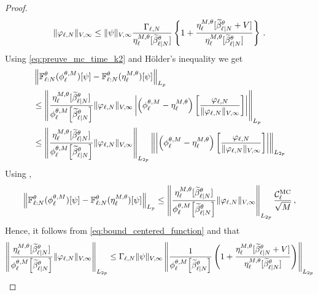 \documentclass[11pt]{article}
\theoremstyle{plain}
\theoremstyle{definition}
\theoremstyle{remark}
\begin{document}
\begin{proof}
\begin{equation}
\|\varphi_{\ell,N}\|_{V,\infty} \le \|\psi\|_{V,\infty} \frac{ \Gamma_{\ell,N} }{ \eta_\ell^{M,\theta} [ \normbackwardfun{\ell}{N}[\theta] ] } \left\{
1+ \frac{ \eta_\ell^{M,\theta} [ \normbackwardfun{\ell}{N}[\theta]+V ] }{ \eta_\ell^{M,\theta} [ \normbackwardfun{\ell}{N}[\theta] ] } 
\right\} \eqsp.
\end{equation}
Using \eqref{eq:preuve_mc_time_k2} and Hölder's inequality we get
\begin{align*}
& \normEc{ \filtertransform{\ell:N}[\theta](\mcfilter{\ell})[\psi] - \filtertransform{\ell:N}[\theta](\eta_\ell^{M,\theta})[\psi] }_{L_p} \\
& \le \normEc{ \frac{ \eta_\ell^{M,\theta} [ \normbackwardfun{\ell}{N}[\theta] ]
}{ \mcfilter{\ell}[ \normbackwardfun{\ell}{N}[\theta] ] } \|\varphi_{\ell,N}\|_{V,\infty} \left| \left(\mcfilter{\ell}-\eta_\ell^{M,\theta}\right) \left[ \frac{\varphi_{\ell,N}}{\|\varphi_{\ell,N}\|_{V,\infty}} \right]\right| }_{L_p} \\
& \le \normEc{ \frac{ \eta_\ell^{M,\theta} [ \normbackwardfun{\ell}{N}[\theta] ] }{ \mcfilter{\ell} [ \normbackwardfun{\ell}{N}[\theta] ] } \|\varphi_{\ell,N}\|_{V,\infty} }_{L_{2p}} \normEc{ \left| \left(\mcfilter{\ell}-\eta_\ell^{M,\theta}\right) \left[ \frac{\varphi_{\ell,N}}{\|\varphi_{\ell,N}\|_{V,\infty}} \right] \right| }_{L_{2p}} \\
\end{align*}
Using ,
\begin{align*}
\normEc{ \filtertransform{\ell:N}[\theta](\mcfilter{\ell})[\psi] - \filtertransform{\ell:N}[\theta](\eta_\ell^{M,\theta})[\psi] }_{L_p} 
 \le \normEc{ \frac{ \eta_\ell^{M,\theta} [ \normbackwardfun{\ell}{N}[\theta] ] }{ \mcfilter{\ell} [ \normbackwardfun{\ell}{N}[\theta] ] } \|\varphi_{\ell,N}\|_{V,\infty} }_{L_{2p}} \frac{\mathcal{C}_\ell^{\rm MC}}{\sqrt M} \eqsp,
\end{align*}
%
Hence, it follows from \eqref{eq:bound_centered_function} and  that
\begin{align*}
\normEc{ \frac{ \eta_\ell^{M,\theta} [ \normbackwardfun{\ell}{N}[\theta] ] }{ \mcfilter{\ell} [ \normbackwardfun{\ell}{N}[\theta] ] } \|\varphi_{\ell,N}\|_{V,\infty} }_{L_{2p}} 
& \le \Gamma_{\ell,N}\|\psi\|_{V,\infty} \normEc{ \frac{1}{\mcfilter{\ell} [ \normbackwardfun{\ell}{N}[\theta] ] } \left( 1+ \frac{ \eta_\ell^{M,\theta} [ \normbackwardfun{\ell}{N}[\theta]+V ] }{ \eta_\ell^{M,\theta} [ \normbackwardfun{\ell}{N}[\theta] ] } \right) }_{L_{2p}} \\

\end{align*}
\end{proof}
\end{document}
